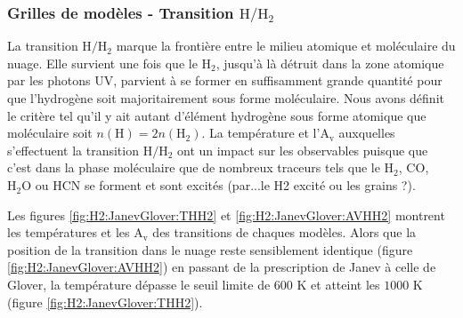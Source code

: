 \subsubsection{Grilles de modèles - Transition $\mathrm{H}/\mathrm{H}_2$}

La transition $\mathrm{H}/\mathrm{H}_2$ marque la frontière entre le milieu atomique et moléculaire du nuage. Elle survient une fois que le $\mathrm{H}_2$, jusqu'à là détruit dans la zone atomique par les photons UV, parvient à se former en suffisamment grande quantité pour que l'hydrogène soit majoritairement sous forme moléculaire. Nous avons définit le critère tel qu'il y ait autant d'élément hydrogène sous forme atomique que moléculaire soit $n(\mathrm{H}) = 2 n(\mathrm{H}_2)$. La température et l'$\mathrm{A}_\mathrm{v}$ auxquelles s'effectuent la transition $\mathrm{H}/\mathrm{H}_2$ ont un impact sur les observables puisque que c'est dans la phase moléculaire que de nombreux traceurs tels que le $\mathrm{H}_2$,  $\mathrm{CO}$, $\mathrm{H}_2\mathrm{O}$ ou $\mathrm{HCN}$ se forment et sont excités (par...le H2 excité ou les grains ?). \newline

Les figures \ref{fig:H2:JanevGlover:THH2} et \ref{fig:H2:JanevGlover:AVHH2} montrent les températures et les $\mathrm{A}_\mathrm{v}$ des transitions de chaques modèles. Alors que la position de la transition dans le nuage reste sensiblement identique (figure \ref{fig:H2:JanevGlover:AVHH2}) en passant de la prescription de Janev à celle de Glover, la température dépasse le seuil limite de $600$ K et atteint les $1000$ K (figure \ref{fig:H2:JanevGlover:THH2}).


